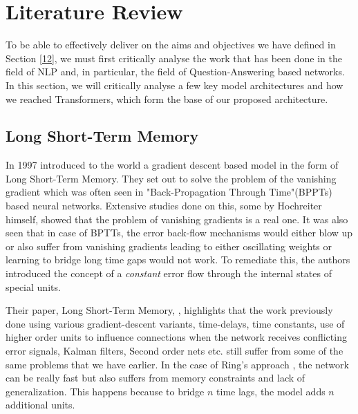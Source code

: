 \documentclass[a4paper,12pt]{report}
\begin{document}
    \chapter{\centering Literature Review}\label{c2litrev}

    To be able to effectively deliver on the aims and objectives we have defined in Section \ref{12}, we must first critically analyse the work that has been done in the field of NLP and, in particular, the field of Question-Answering based networks. In this section, we will critically analyse a few key model architectures and how we reached Transformers, which form the base of our proposed architecture.

\cite{fastQA}

        \section{Long Short-Term Memory}\label{22}

            In 1997 \cite{lstmoriginal} introduced to the world a gradient descent based model in the form of Long Short-Term Memory. They set out to solve the problem of the vanishing gradient which was often seen in "Back-Propagation Through Time"(BPPTs) based neural networks. Extensive studies done on this, some by Hochreiter himself, showed that the problem of vanishing gradients is a real one. It was also seen that in case of BPTTs, the error back-flow mechanisms would either blow up or also suffer from vanishing gradients leading to either oscillating weights or learning to bridge long time gaps would not work. To remediate this, the authors introduced the concept of a \textit{constant} error flow through the internal states of special units.

            Their paper, Long Short-Term Memory, \citep{lstmoriginal}, highlights that the work previously done using various gradient-descent variants, time-delays, time constants, use of higher order units to influence connections when the network receives conflicting error signals, Kalman filters, Second order nets etc. still suffer from some of the same problems that we have earlier. In the case of Ring's approach \citep{lstmRing}, the network can be really fast but also suffers from memory constraints and lack of generalization. This happens because to bridge $ n $ time lags, the model adds $ n $ additional units.
\end{document}
